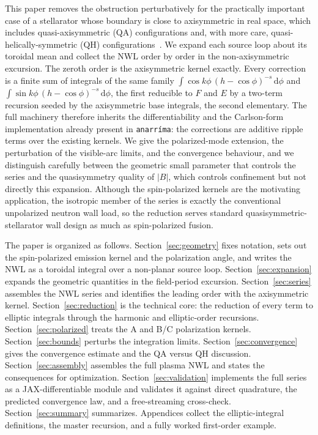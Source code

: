 \documentclass[11pt]{article}
\newcommand{\dd}{\,\mathrm{d}}
\begin{document}
This paper removes the obstruction perturbatively for the practically important case of a stellarator whose boundary is close to axisymmetric in real space, which includes quasi-axisymmetric (QA) configurations and, with more care, quasi-helically-symmetric (QH) configurations~\cite{nuhrenberg1988,boozer1983,landreman2022,helander2014}. We expand each source loop about its toroidal mean and collect the NWL order by order in the non-axisymmetric excursion. The zeroth order is the axisymmetric kernel exactly. Every correction is a finite sum of integrals of the same family $\int \cos k\phi\,(h-\cos\phi)^{-s}\dd\phi$ and $\int \sin k\phi\,(h-\cos\phi)^{-s}\dd\phi$, the first reducible to $F$ and $E$ by a two-term recursion seeded by the axisymmetric base integrals, the second elementary. The full machinery therefore inherits the differentiability and the Carlson-form implementation already present in \texttt{anarr\'ima}: the corrections are additive ripple terms over the existing kernels. We give the polarized-mode extension, the perturbation of the visible-arc limits, and the convergence behaviour, and we distinguish carefully between the geometric small parameter that controls the series and the quasisymmetry quality of $|B|$, which controls confinement but not directly this expansion. Although the spin-polarized kernels are the motivating application, the isotropic member of the series is exactly the conventional unpolarized neutron wall load, so the reduction serves standard quasisymmetric-stellarator wall design as much as spin-polarized fusion.

The paper is organized as follows. Section~\ref{sec:geometry} fixes notation, sets out the spin-polarized emission kernel and the polarization angle, and writes the NWL as a toroidal integral over a non-planar source loop. Section~\ref{sec:expansion} expands the geometric quantities in the field-period excursion. Section~\ref{sec:series} assembles the NWL series and identifies the leading order with the axisymmetric kernel. Section~\ref{sec:reduction} is the technical core: the reduction of every term to elliptic integrals through the harmonic and elliptic-order recursions. Section~\ref{sec:polarized} treats the A and B/C polarization kernels. Section~\ref{sec:bounds} perturbs the integration limits. Section~\ref{sec:convergence} gives the convergence estimate and the QA versus QH discussion. Section~\ref{sec:assembly} assembles the full plasma NWL and states the consequences for optimization. Section~\ref{sec:validation} implements the full series as a JAX-differentiable module and validates it against direct quadrature, the predicted convergence law, and a free-streaming cross-check. Section~\ref{sec:summary} summarizes. Appendices collect the elliptic-integral definitions, the master recursion, and a fully worked first-order example.
\end{document}
